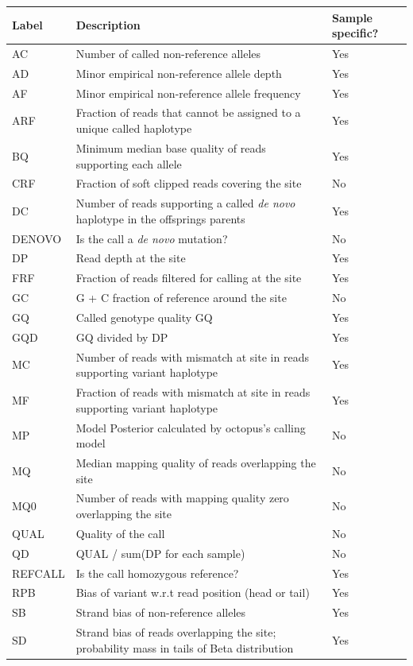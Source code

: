\documentclass{article}
\begin{document}
\begin{center}
\begin{tabular}{lll}
Label & Description & Sample specific? \\
\hline
AC & Number of called non-reference alleles & Yes \\
AD & Minor empirical non-reference allele depth & Yes \\
AF & Minor empirical non-reference allele frequency & Yes \\
ARF & Fraction of reads that cannot be assigned to a unique called haplotype & Yes \\
BQ & Minimum median base quality of reads supporting each allele & Yes \\
CRF & Fraction of soft clipped reads covering the site & No \\
DC & Number of reads supporting a called \textit{de novo} haplotype in the offsprings parents & Yes \\
DENOVO & Is the call a \textit{de novo} mutation? & No \\
DP & Read depth at the site & Yes \\
FRF & Fraction of reads filtered for calling at the site & Yes \\
GC & G + C fraction of reference around the site & No \\
GQ & Called genotype quality GQ & Yes \\
GQD & GQ divided by DP & Yes \\
MC & Number of reads with mismatch at site in reads supporting variant haplotype  & Yes \\
MF & Fraction of reads with mismatch at site in reads supporting variant haplotype  & Yes \\
MP & Model Posterior calculated by octopus's calling model & No \\
MQ & Median mapping quality of reads overlapping the site & No \\
MQ0 & Number of reads with mapping quality zero overlapping the site & No \\
QUAL & Quality of the call & No \\
QD & QUAL / sum(DP for each sample) & No \\
REFCALL & Is the call homozygous reference? & Yes \\
RPB & Bias of variant w.r.t read position (head or tail) & Yes \\
SB & Strand bias of non-reference alleles & Yes \\
SD & Strand bias of reads overlapping the site; probability mass in tails of Beta distribution & Yes \\

\end{tabular}
\end{center}
\end{document}
